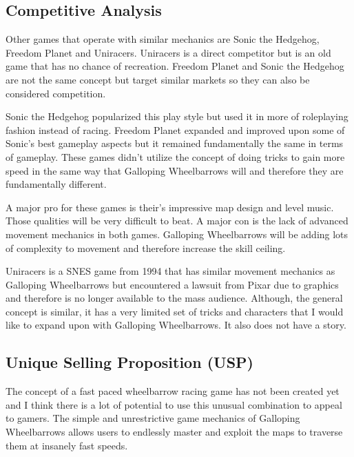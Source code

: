 \documentclass[12pt,]{article}
\begin{document}
\hypertarget{competitive-analysis}{%
\subsection{Competitive Analysis}\label{competitive-analysis}}

Other games that operate with similar mechanics are Sonic the Hedgehog,
Freedom Planet and Uniracers. Uniracers is a direct competitor but is an
old game that has no chance of recreation. Freedom Planet and Sonic the
Hedgehog are not the same concept but target similar markets so they can
also be considered competition.

Sonic the Hedgehog popularized this play style but used it in more of
roleplaying fashion instead of racing. Freedom Planet expanded and
improved upon some of Sonic's best gameplay aspects but it remained
fundamentally the same in terms of gameplay. These games didn't utilize
the concept of doing tricks to gain more speed in the same way that
Galloping Wheelbarrows will and therefore they are fundamentally
different.

A major pro for these games is their's impressive map design and level
music. Those qualities will be very difficult to beat. A major con is
the lack of advanced movement mechanics in both games. Galloping
Wheelbarrows will be adding lots of complexity to movement and therefore
increase the skill ceiling.

Uniracers is a SNES game from 1994 that has similar movement mechanics
as Galloping Wheelbarrows but encountered a lawsuit from Pixar due to
graphics and therefore is no longer available to the mass audience.
Although, the general concept is similar, it has a very limited set of
tricks and characters that I would like to expand upon with Galloping
Wheelbarrows. It also does not have a story.

\hypertarget{unique-selling-proposition-usp}{%
\subsection{Unique Selling Proposition
(USP)}\label{unique-selling-proposition-usp}}

The concept of a fast paced wheelbarrow racing game has not been created
yet and I think there is a lot of potential to use this unusual
combination to appeal to gamers. The simple and unrestrictive game
mechanics of Galloping Wheelbarrows allows users to endlessly master and
exploit the maps to traverse them at insanely fast speeds.
\end{document}
